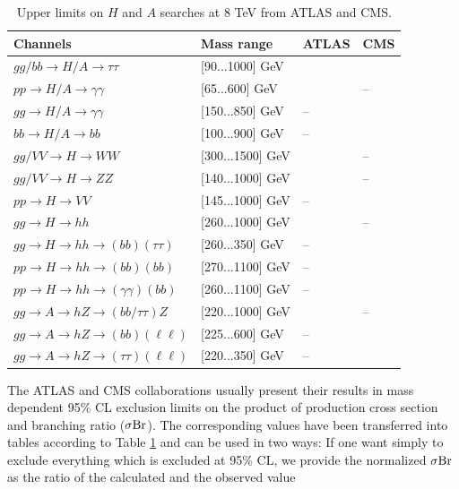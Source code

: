 \documentclass[preprint,3p,12pt]{elsarticle}
\begin{document}
{\begin{table}[tb]
 \centering
 \caption{Upper limits on $H$ and $A$ searches at 8 TeV from ATLAS and CMS.}\vspace{0.2cm}
  \begin{tabular}{|l|l|l|l|}
    \hline
      Channels & Mass range & ATLAS & CMS\\
    \hline
      $gg/bb \to H/A \to \tau \tau $ & [90...1000] GeV & \cite{Aad:2014vgg} & \cite{CMS:2015mca} \\
    \hline
      $pp\to H/A \to \gamma \gamma $ & [65...600] GeV & \cite{Aad:2014ioa} & --\\
    \hline
      $gg\to H/A \to \gamma \gamma $ & [150...850] GeV & -- & \cite{Khachatryan:2015qba}\\
    \hline
      $bb\to H/A \to bb$ & [100...900] GeV &  -- & \cite{Khachatryan:2015tra}\\
    \hline
      $gg/VV \to H\to WW$ & [300...1500] GeV & \cite{Aad:2015agg} & --\\
    \hline
      $gg/VV \to H\to ZZ$ & [140...1000] GeV & \cite{Aad:2015kna} & --\\
    \hline
      $pp\to H\to VV$ & [145...1000] GeV & -- & \cite{Khachatryan:2015cwa}\\
    \hline
      $gg\to H\to hh$ & [260...1000] GeV & \cite{Aad:2015xja} & --\\
    \hline
      $gg\to H\to hh\to (bb)(\tau \tau )$ & [260...350] GeV & -- & \cite{Khachatryan:2015tha}\\
    \hline
      $pp\to H\to hh\to (bb)(bb)$ & [270...1100] GeV & -- & \cite{Khachatryan:2015yea}\\
    \hline
      $pp\to H\to hh\to (\gamma \gamma )(bb)$ & [260...1100] GeV & -- & \cite{CMS:2014ipa}\\
    \hline
      $gg\to A\to hZ\to (bb/\tau \tau )Z$ & [220...1000] GeV & \cite{Aad:2015wra} & --\\
    \hline
      $gg\to A\to hZ\to (bb)(\ell \ell )$ & [225...600] GeV & -- & \cite{Khachatryan:2015lba}\\
    \hline
      $gg\to A\to hZ\to (\tau \tau )(\ell \ell )$ & [220...350] GeV & -- & \cite{Khachatryan:2015tha}\\
    \hline
  \end{tabular}
 \label{tab:HandAsearchlimits}
\end{table} 

The ATLAS and CMS collaborations usually present their results in mass dependent 95\% CL exclusion limits on the product of production cross section and branching ratio ($\sigma {\rm Br}$). The corresponding values have been transferred into tables according to Table \ref{tab:HandAsearchlimits} and can be used in two ways:
If one want simply to exclude everything which is excluded at 95\% CL, we provide the normalized $\sigma {\rm Br}$ as the ratio of the calculated and the observed value

}
\end{document}
